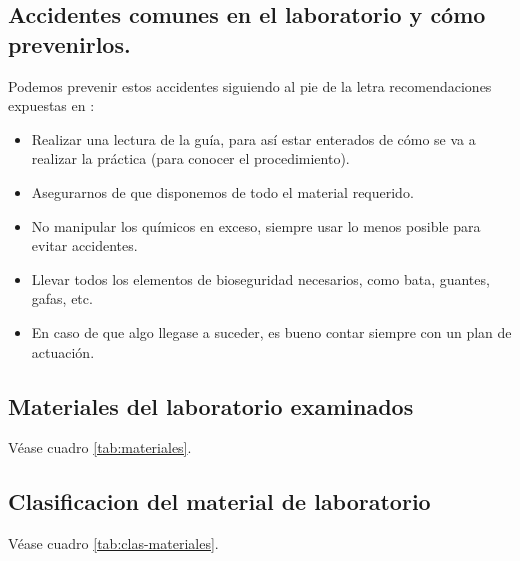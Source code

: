 \documentclass[letterpaper]{IEEEconf}
\begin{document}
\subsection{Accidentes comunes en el laboratorio y cómo prevenirlos.}
Podemos prevenir estos accidentes siguiendo al pie de la letra recomendaciones expuestas en \cite{Seglab}:
\begin{itemize}
\item Realizar una lectura de la guía, para así estar enterados de cómo se va a realizar la práctica (para conocer el procedimiento). 
\item Asegurarnos de que disponemos de todo el material requerido. 
\item No manipular los químicos en exceso, siempre usar lo menos posible para evitar accidentes.
\item Llevar todos los elementos de bioseguridad necesarios, como bata, guantes, gafas, etc.
\item En caso de que algo llegase a suceder, es bueno contar siempre con un plan de actuación.
\end{itemize}

\subsection{Materiales del laboratorio examinados}

Véase cuadro \ref{tab:materiales}.

\subsection{Clasificacion del material de laboratorio}

Véase cuadro \ref{tab:clas-materiales}.
\end{document}

